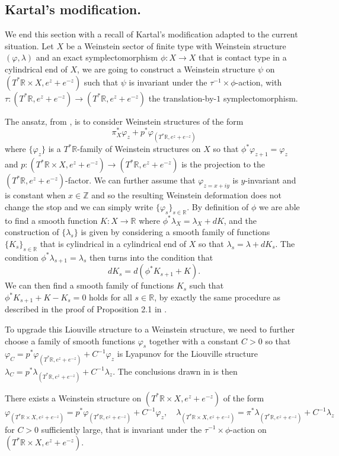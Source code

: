 \subsection{Kartal's modification.} We end this section with a recall of Kartal's modification \cite{Kartal21} adapted to the current situation. Let $X$ be a Weinstein sector of finite type with Weinstein structure $(\varphi,\lambda)$ and an exact symplectomorphism $\phi\colon X\to X$ that is contact type in a cylindrical end of $X$, we are going to construct a Weinstein structure $\psi$ on $(T^{\ast}\mathbb{R}\times X,e^z+e^{-z})$ such that $\psi$ is invariant under the $\tau^{-1}\times\phi$-action, with $\tau\colon (T^{\ast}\mathbb{R},e^z+e^{-z})\to (T^{\ast}\mathbb{R},e^z+e^{-z})$ the translation-by-$1$ symplectomorphism.\par
The ansatz, from \cite{Kartal21}, is to consider Weinstein structures of the form\[
\pi_X^{\ast}\varphi_z +p^{\ast}\varphi_{(T^{\ast}\mathbb{R},e^z+e^{-z})}
\]where $\{\varphi_z\}$ is a $T^{\ast}\mathbb{R}$-family of Weinstein structures on $X$ so that $\phi^{\ast}\varphi_{z+1}=\varphi_z$ and $p\colon (T^{\ast}\mathbb{R}\times X,e^z+e^{-z})\to (T^{\ast}\mathbb{R},e^z+e^{-z})$ is the projection to the $(T^{\ast}\mathbb{R},e^z+e^{-z})$-factor. We can further assume that $\varphi_{z=x+iy}$ is $y$-invariant and is constant when $x\in\mathbb{Z}$ and so the resulting Weinstein deformation does not change the stop and we can simply write $\{\varphi_s\}_{s\in\mathbb{R}}$. By definition of $\phi$ we are able to find a smooth function $K\colon X\to\mathbb{R}$ where $\phi^{\ast}\lambda_X=\lambda_X+dK$, and the construction of $\{\lambda_s\}$ is given by considering a smooth family of functions $\{K_s\}_{s\in\mathbb{R}}$ that is cylindrical in a cylindrical end of $X$ so that $\lambda_s =\lambda +dK_s$. The condition $\phi^{\ast}\lambda_{s+1}=\lambda_s$ then turns into the condition that \[
    dK_s=d(\phi^{\ast} K_{s+1}+K).
\]We can then find a smooth family of functions $K_s$ such that $\phi^{\ast} K_{s+1} +K-K_s=0$ holds for all $s\in\mathbb{R}$, by exactly the same procedure as described in the proof of Proposition 2.1 in \cite{Kartal21}.\par
To upgrade this Liouville structure to a Weinstein structure, we need to further choose a family of smooth functions $\varphi_s$ together with a constant $C>0$ so that $\varphi_C =p^{\ast}\varphi_{(T^{\ast}\mathbb{R},e^z+e^{-z})} +C^{-1}\varphi_z$ is Lyapunov for the Liouville structure $\lambda_C =p^{\ast}\lambda_{(T^{\ast}\mathbb{R},e^z+e^{-z})} +C^{-1}\lambda_z$. The conclusions drawn in \cite{Kartal21} is then 
\begin{prp}\label{prp:Kartal-modification-Weinstein}
    There exists a Weinstein structure on $(T^{\ast}\mathbb{R}\times X,e^z+e^{-z})$ of the form \[
        \varphi_{(T^{\ast}\mathbb{R}\times X,e^z+e^{-z})} =p^{\ast}\varphi_{(T^{\ast}\mathbb{R},e^z+e^{-z})}+C^{-1}\varphi_z,\quad \lambda_{(T^{\ast}\mathbb{R}\times X,e^z+e^{-z})}=\pi^{\ast}\lambda_{(T^{\ast}\mathbb{R},e^z+e^{-z})} +C^{-1}\lambda_z
    \]for $C>0$ sufficiently large, that is invariant under the $\tau^{-1}\times\phi$-action on $(T^{\ast}\mathbb{R}\times X,e^z+e^{-z})$.
\end{prp}
